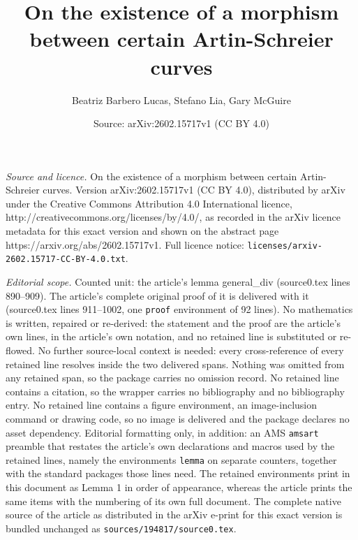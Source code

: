 \documentclass[10pt,a4paper]{amsart}
\title{On the existence of a morphism between certain Artin-Schreier curves}
\author{Beatriz Barbero Lucas, Stefano Lia, Gary McGuire}
\date{Source: arXiv:2602.15717v1 (CC BY 4.0)}
\begin{document}
\maketitle

\noindent\emph{Source and licence.} On the existence of a morphism between certain Artin-Schreier curves. Version arXiv:2602.15717v1 (CC BY 4.0), distributed by arXiv under the Creative Commons Attribution 4.0 International licence, http://creativecommons.org/licenses/by/4.0/, as recorded in the arXiv licence metadata for this exact version and shown on the abstract page https://arxiv.org/abs/2602.15717v1. Full licence notice: \texttt{licenses/arxiv-2602.15717-CC-BY-4.0.txt}.\par\smallskip

\noindent\textit{Editorial scope.} Counted unit: the article's lemma general\_div (source0.tex lines 890--909). The article's complete original proof of it is delivered with it (source0.tex lines 911--1002, one \texttt{proof} environment of 92 lines). No mathematics is written, repaired or re-derived: the statement and the proof are the article's own lines, in the article's own notation, and no retained line is substituted or re-flowed.  No further source-local context is needed: every cross-reference of every retained line resolves inside the two delivered spans.  Nothing was omitted from any retained span, so the package carries no omission record.  No retained line contains a citation, so the wrapper carries no bibliography and no bibliography entry.  No retained line contains a figure environment, an image-inclusion command or drawing code, so no image is delivered and the package declares no asset dependency.  Editorial formatting only, in addition: an AMS \texttt{amsart} preamble that restates the article's own declarations and macros used by the retained lines, namely the environments \texttt{lemma} on separate counters, together with the standard packages those lines need.  The retained environments print in this document as Lemma 1 in order of appearance, whereas the article prints the same items with the numbering of its own full document.  The complete native source of the article as distributed in the arXiv e-print for this exact version is bundled unchanged as \texttt{sources/194817/source0.tex}.
\end{document}
